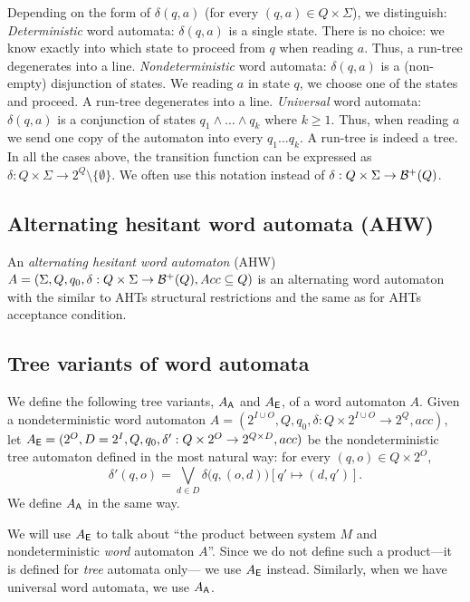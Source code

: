 Depending on the form of $\delta(q,a)$ (for every $(q,a) \in Q\times\Sigma$),
we distinguish:
\li
\- \emph{Deterministic} word automata: $\delta(q,a)$ is a single state.
   There is no choice: we know exactly into which state to proceed
   from $q$ when reading $a$.
   Thus, a run-tree degenerates into a line.
\- \emph{Nondeterministic} word automata: $\delta(q,a)$ is a (non-empty) disjunction of states.
   We reading $a$ in state $q$, we choose one of the states and proceed.
   A run-tree degenerates into a line.
\- \emph{Universal} word automata: $\delta(q,a)$ is a conjunction of states
   $q_1\land...\land q_k$ where $k \geq 1$.
   Thus, when reading $a$ we send one copy of the automaton into every $q_1 ... q_k$.
   A run-tree is indeed a tree.
\il
In all the cases above,
the transition function can be expressed as $\delta: Q\times\Sigma \to 2^Q \setminus \{\emptyset\}$.
We often use this notation instead of $\delta: Q\times\Sigma \to {\cal B}^+(Q)$.


\subsection*{Alternating hesitant word automata (AHW)} \label{page:defs:ahw}

An \emph{alternating hesitant word automaton} (AHW)
$A=(\Sigma, Q, q_0, \delta: Q\times\Sigma \to {\cal B}^+(Q), Acc \subseteq Q)$
is an alternating word automaton with
the similar to AHTs structural restrictions and the same as for AHTs acceptance condition.


\subsection*{Tree variants of word automata} \label{page:defs:tree_variants}

We define the following tree variants, $A_{\operatorname{\mathsf{A}}}$ and $A_{\operatorname{\mathsf{E}}}$, of a word automaton $A$.
Given a nondeterministic word automaton
$A = (2^{I\cup O}, Q, q_0, \delta: Q\times 2^{I\cup O} \to 2^Q, acc)$,
let $A_{\operatorname{\mathsf{E}}} = (2^O, D=2^I, Q,q_0, \delta': Q\times 2^O \to 2^{Q\times D}, acc)$
be the nondeterministic tree automaton defined in the most natural way:
for every $(q,o) \in Q \times 2^O$,
$$
\delta'(q,o) = \bigvee_{d \in D} \delta\big(q,(o,d)\big) \left[q' \mapsto (d,q')\right].
$$
We define $A_{\operatorname{\mathsf{A}}}$ in the same way.

We will use $A_{\operatorname{\mathsf{E}}}$ to talk about
``the product between system $M$ and nondeterministic \emph{word} automaton $A$''.
Since we do not define such a product---it is defined for \emph{tree} automata only---%
we use $A_{\operatorname{\mathsf{E}}}$ instead.
Similarly, when we have universal word automata, we use $A_{\operatorname{\mathsf{A}}}$.

